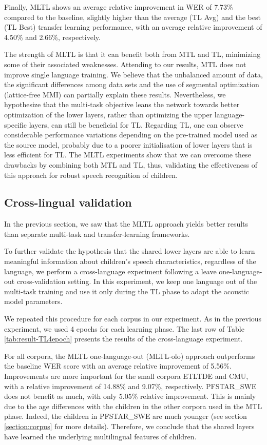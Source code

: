Finally, MLTL shows an average relative improvement in WER of 7.73\%  compared to the baseline, slightly higher than the average (TL Avg) and the best (TL Best) transfer learning performance, with an average relative improvement of 4.50\% and 2.66\%, respectively. 

The strength of MLTL is that it can benefit both from MTL and TL, minimizing some of their associated weaknesses.
Attending to our results, MTL does not improve single language training. We believe that the unbalanced amount of data, the significant differences among data sets and the use of segmental optimization (lattice-free MMI) can partially explain these results. Nevertheless, we hypothesize that the multi-task objective leans the network towards 
better optimization of the lower layers, rather than optimizing the upper language-specific layers, can still be beneficial for TL.
Regarding TL, one can observe considerable performance variations depending on the pre-trained model used as the source model, probably due to a poorer initialisation of lower layers that is less efficient for TL. The MLTL experiments show that we can overcome these drawbacks by combining both MTL and TL, thus, validating the effectiveness of this approach for robust speech recognition of children.



\subsection{Cross-lingual validation}
\label{section:olo}

In the previous section, we saw that the MLTL approach yields better results than separate multi-task and transfer-learning frameworks.

To further validate the hypothesis that the shared lower layers are able to learn meaningful information about children's speech characteristics, regardless of the language, we perform a cross-language experiment following a leave one-language-out cross-validation setting. In this experiment, we keep one language out of the multi-task training and use it only during the TL phase to adapt the acoustic model parameters. 

We repeated this procedure for each corpus in our experiment. As in the previous experiment, we used 4 epochs for each learning phase. The last row of Table \ref{tab:result-TL4epoch} presents the results of the cross-language experiment.

For all corpora, the MLTL one-language-out (MLTL-olo) approach outperforms the baseline WER score with an average relative improvement of 5.56\%. Improvements are more important for the small corpora ETLTDE and CMU, with a  relative improvement of 14.88\% and 9.07\%, respectively. PFSTAR\_SWE does not benefit as much, with only 5.05\% relative improvement. This is mainly due to the age differences with the children in the other corpora used in the MTL phase. Indeed, the children in PFSTAR\_SWE are much younger (see section  \ref{section:corpus} for more details). Therefore, we conclude that the shared layers have learned the underlying multilingual features of children.

